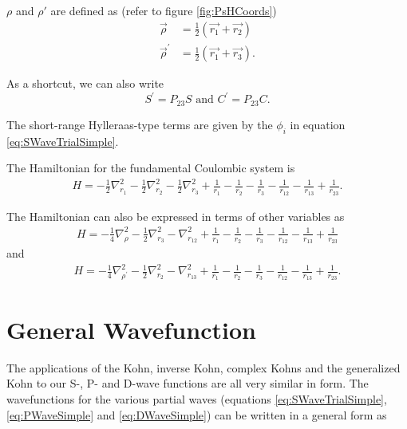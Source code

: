 \documentclass[Dissertation.tex]{subfiles}
\begin{document}
$\rho$ and $\rho'$ are defined as (refer to figure \ref{fig:PsHCoords})
\begin{subequations}
\begin{align}
\vec{\rho} &= \frac{1}{2}\left(\vec{r_1} + \vec{r_2}\right) \label{eq:RhoDef}\\
\vec{\rho}^\prime &= \frac{1}{2}\left(\vec{r_1} + \vec{r_3}\right) \label{eq:RhopDef}.
\end{align}
\end{subequations}

\noindent As a shortcut, we can also write
\begin{equation}
S^\prime = P_{23} S \text{ and } C^\prime = P_{23} C.
\label{eq:SCprime}
\end{equation}

The short-range Hylleraas-type terms are given by the $\phi_i$ in equation \ref{eq:SWaveTrialSimple}. 

The Hamiltonian for the fundamental Coulombic system is
\begin{align}
\label{eq:Hamiltonian1}
H = -\frac{1}{2} \nabla_{r_1}^2 - \frac{1}{2} \nabla_{r_2}^2 - \frac{1}{2} \nabla_{r_3}^2 + \frac{1}{r_1} - \frac{1}{r_2} - \frac{1}{r_3} - \frac{1}{r_{12}} -\frac {1}{r_{13}} + \frac{1}{r_{23}}.
\end{align}

\noindent The Hamiltonian can also be expressed in terms of other variables as
\begin{align}
H = -\frac{1}{4} \nabla_{\rho}^2 - \frac{1}{2} \nabla_{r_3}^2 - \nabla_{r_{12}}^2 + \frac{1}{r_1} - \frac{1}{r_2} - \frac{1}{r_3} - \frac{1}{r_{12}} - \frac{1}{r_{13}} + \frac{1}{r_{23}}
\label{eq:Hamiltonian2}
\end{align}
and
\begin{align}
H = -\frac{1}{4} \nabla_{\rho^\prime}^2 - \frac{1}{2} \nabla_{r_2}^2 - \nabla_{r_{13}}^2 + \frac{1}{r_1} - \frac{1}{r_2} - \frac{1}{r_3} - \frac{1}{r_{12}} - \frac{1}{r_{13}} + \frac{1}{r_{23}}.
\label{eq:Hamiltonian3}
\end{align}


\section{General Wavefunction}

The applications of the Kohn, inverse Kohn, complex Kohns and the generalized Kohn to our S-, P- and D-wave functions are all very similar in form. The wavefunctions for the various partial waves (equations \ref{eq:SWaveTrialSimple}, \ref{eq:PWaveSimple} and \ref{eq:DWaveSimple}) can be written in a general form as
\end{document}
